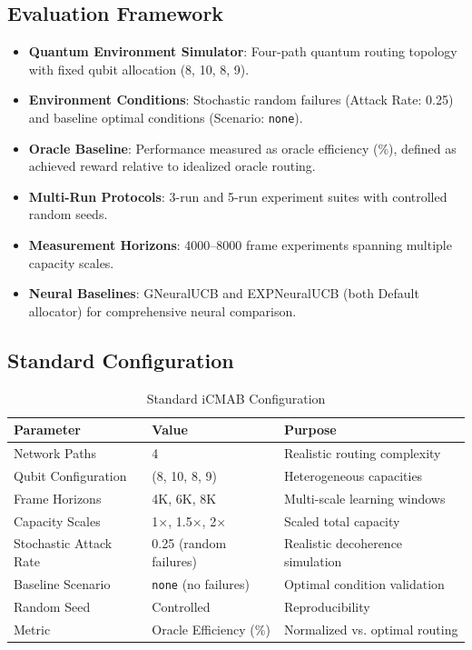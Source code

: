 \documentclass[12pt,a4paper]{article}
\begin{document}
\subsection{Evaluation Framework}
\begin{itemize}
\item \textbf{Quantum Environment Simulator}: Four-path quantum routing topology with fixed qubit allocation (8, 10, 8, 9).
\item \textbf{Environment Conditions}: Stochastic random failures (Attack Rate: 0.25) and baseline optimal conditions (Scenario: \texttt{none}).
\item \textbf{Oracle Baseline}: Performance measured as oracle efficiency (\%), defined as achieved reward relative to idealized oracle routing.
\item \textbf{Multi-Run Protocols}: 3-run and 5-run experiment suites with controlled random seeds.
\item \textbf{Measurement Horizons}: 4000--8000 frame experiments spanning multiple capacity scales.
\item \textbf{Neural Baselines}: GNeuralUCB and EXPNeuralUCB (both Default allocator) for comprehensive neural comparison.
\end{itemize}

\subsection{Standard Configuration}
\begin{table}[H]
\centering
\caption{Standard iCMAB Configuration}
\begin{tabular}{@{}lll@{}}
\toprule
\textbf{Parameter} & \textbf{Value} & \textbf{Purpose} \\
\midrule
Network Paths & 4 & Realistic routing complexity \\
Qubit Configuration & (8, 10, 8, 9) & Heterogeneous capacities \\
Frame Horizons & 4K, 6K, 8K & Multi-scale learning windows \\
Capacity Scales & 1$\times$, 1.5$\times$, 2$\times$ & Scaled total capacity \\
Stochastic Attack Rate & 0.25 (random failures) & Realistic decoherence simulation \\
Baseline Scenario & \texttt{none} (no failures) & Optimal condition validation \\
Random Seed & Controlled & Reproducibility \\
Metric & Oracle Efficiency (\%) & Normalized vs. optimal routing \\
\bottomrule
\end{tabular}
\end{table}
\end{document}
